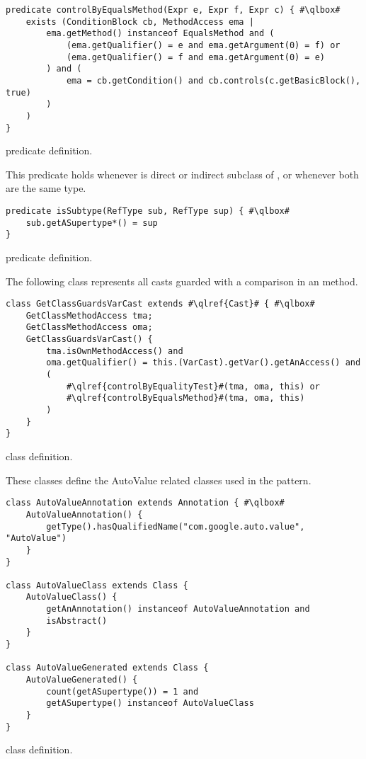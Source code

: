 \begin{listing}
\begin{verbatim}
predicate controlByEqualsMethod(Expr e, Expr f, Expr c) { #\qlbox#
	exists (ConditionBlock cb, MethodAccess ema |
		ema.getMethod() instanceof EqualsMethod and (
			(ema.getQualifier() = e and ema.getArgument(0) = f) or
			(ema.getQualifier() = f and ema.getArgument(0) = e)
		) and (
			ema = cb.getCondition() and cb.controls(c.getBasicBlock(), true)
		)
	)
}
\end{verbatim}
\caption{ predicate definition.}
\label{lst:ql:controlByEqualsMethod}
\end{listing}

This predicate holds whenever  is direct or indirect subclass of , or whenever both are the same type.

\begin{listing}
\begin{verbatim}
predicate isSubtype(RefType sub, RefType sup) { #\qlbox#
	sub.getASupertype*() = sup
}
\end{verbatim}
\caption{ predicate definition.}
\label{lst:ql:isSubtype}
\end{listing}

The following class represents all casts guarded with a  comparison in an  method.

\begin{listing}
\begin{verbatim}
class GetClassGuardsVarCast extends #\qlref{Cast}# { #\qlbox#
	GetClassMethodAccess tma;
	GetClassMethodAccess oma;
	GetClassGuardsVarCast() {
		tma.isOwnMethodAccess() and
		oma.getQualifier() = this.(VarCast).getVar().getAnAccess() and
		(
			#\qlref{controlByEqualityTest}#(tma, oma, this) or
			#\qlref{controlByEqualsMethod}#(tma, oma, this)
		)
	}
}
\end{verbatim}
\caption{ class definition.}
\label{lst:ql:GetClassGuardsVarCast}
\end{listing}

These classes define the AutoValue related classes used in the  pattern.

\begin{listing}
\begin{verbatim}
class AutoValueAnnotation extends Annotation { #\qlbox#
	AutoValueAnnotation() {
		getType().hasQualifiedName("com.google.auto.value", "AutoValue")
	}
}

class AutoValueClass extends Class {
	AutoValueClass() {
		getAnAnnotation() instanceof AutoValueAnnotation and
		isAbstract()
	}
}

class AutoValueGenerated extends Class {
	AutoValueGenerated() {
		count(getASupertype()) = 1 and
		getASupertype() instanceof AutoValueClass
	}
}
\end{verbatim}
\caption{ class definition.}
\label{lst:ql:AutoValueGenerated}
\end{listing}

